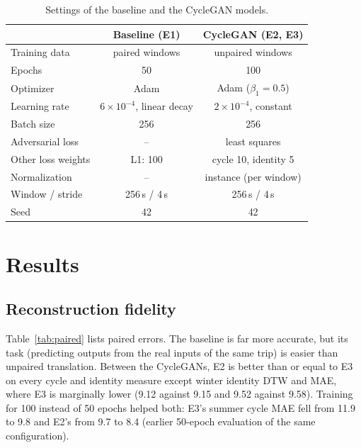 \documentclass[conference]{IEEEtran}
\begin{document}
\begin{table}[t]
\caption{Settings of the baseline and the CycleGAN models.}
\label{tab:hyper}
\centering\small
\setlength{\tabcolsep}{3pt}
\begin{tabular}{lcc}
\toprule
 & Baseline (E1) & CycleGAN (E2, E3)\\
\midrule
Training data & paired windows & unpaired windows\\
Epochs & 50 & 100\\
Optimizer & Adam & Adam ($\beta_1=0.5$)\\
Learning rate & $6\times10^{-4}$, linear decay & $2\times10^{-4}$, constant\\
Batch size & 256 & 256\\
Adversarial loss & -- & least squares\\
Other loss weights & L1: 100 & cycle 10, identity 5\\
Normalization & -- & instance (per window)\\
Window / stride & 256\,s / 4\,s & 256\,s / 4\,s\\
Seed & 42 & 42\\
\bottomrule
\end{tabular}
\end{table}

\section{Results}
\subsection{Reconstruction fidelity}
Table~\ref{tab:paired} lists paired errors. The baseline is far more accurate, but its task (predicting outputs from the real inputs of the same trip) is easier than unpaired translation. Between the CycleGANs, E2 is better than or equal to E3 on every cycle and identity measure except winter identity DTW and MAE, where E3 is marginally lower (9.12 against 9.15 and 9.52 against 9.58). Training for 100 instead of 50 epochs helped both: E3's summer cycle MAE fell from 11.9 to 9.8 and E2's from 9.7 to 8.4 (earlier 50-epoch evaluation of the same configuration).
\end{document}
